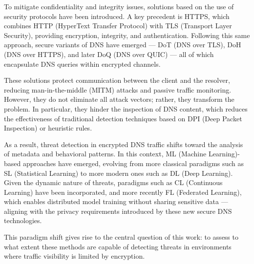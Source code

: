 To mitigate confidentiality and integrity issues, solutions based on the use of security protocols have been introduced. A key precedent is HTTPS, which combines HTTP (HyperText Transfer Protocol) with TLS (Transport Layer Security), providing encryption, integrity, and authentication. Following this same approach, secure variants of DNS have emerged — DoT (DNS over TLS), DoH (DNS over HTTPS), and later DoQ (DNS over QUIC) — all of which encapsulate DNS queries within encrypted channels.

These solutions protect communication between the client and the resolver, reducing man-in-the-middle (MITM) attacks and passive traffic monitoring. However, they do not eliminate all attack vectors; rather, they transform the problem. In particular, they hinder the inspection of DNS content, which reduces the effectiveness of traditional detection techniques based on DPI (Deep Packet Inspection) or heuristic rules.

As a result, threat detection in encrypted DNS traffic shifts toward the analysis of metadata and behavioral patterns. In this context, ML (Machine Learning)-based approaches have emerged, evolving from more classical paradigms such as SL (Statistical Learning) to more modern ones such as DL (Deep Learning). Given the dynamic nature of threats, paradigms such as CL (Continuous Learning) have been incorporated, and more recently FL (Federated Learning), which enables distributed model training without sharing sensitive data — aligning with the privacy requirements introduced by these new secure DNS technologies.

This paradigm shift gives rise to the central question of this work: to assess to what extent these methods are capable of detecting threats in environments where traffic visibility is limited by encryption.
